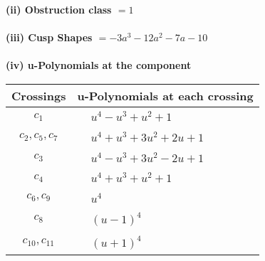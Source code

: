 \documentclass[1p]{elsarticle_modified}
\theoremstyle{definition}
\begin{document}
\flushleft \textbf{(ii) Obstruction class $= 1$}\\~\\
\flushleft \textbf{(iii) Cusp Shapes $= -3 a^3-12 a^2-7 a-10$}\\~\\
\newpage\renewcommand{\arraystretch}{1}
\flushleft \textbf{(iv) u-Polynomials at the component}\newline \\
\begin{tabular}{m{50pt}|m{274pt}}
Crossings & \hspace{64pt}u-Polynomials at each crossing \\
\hline $$\begin{aligned}c_{1}\end{aligned}$$&$\begin{aligned}
&u^4- u^3+u^2+1
\end{aligned}$\\
\hline $$\begin{aligned}c_{2},c_{5},c_{7}\end{aligned}$$&$\begin{aligned}
&u^4+u^3+3 u^2+2 u+1
\end{aligned}$\\
\hline $$\begin{aligned}c_{3}\end{aligned}$$&$\begin{aligned}
&u^4- u^3+3 u^2-2 u+1
\end{aligned}$\\
\hline $$\begin{aligned}c_{4}\end{aligned}$$&$\begin{aligned}
&u^4+u^3+u^2+1
\end{aligned}$\\
\hline $$\begin{aligned}c_{6},c_{9}\end{aligned}$$&$\begin{aligned}
&u^4
\end{aligned}$\\
\hline $$\begin{aligned}c_{8}\end{aligned}$$&$\begin{aligned}
&(u-1)^4
\end{aligned}$\\
\hline $$\begin{aligned}c_{10},c_{11}\end{aligned}$$&$\begin{aligned}
&(u+1)^4
\end{aligned}$\\
\hline
\end{tabular}\\~\\
\end{document}
